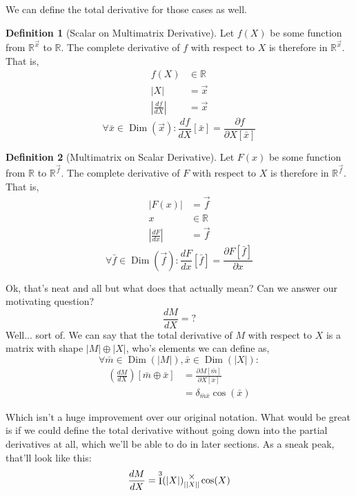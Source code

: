 \documentclass[12pt]{article}
\theoremstyle{definition}
\newtheorem{definition}{Definition}[section]
\theoremstyle{plain}
\theoremstyle{ppart}
\DeclareMathOperator{\Dim}{Dim}
\DeclareMathOperator{\Ident}{I}
\newcommand{\mmult}[1]{\text{\raisebox{1ex}{$\underset{#1}{\times}$}}}
\begin{document}
We can define the total derivative for those cases as well.

\begin{definition}[Scalar on Multimatrix Derivative]
\label{sm_derivative}
Let $f(X)$ be some function from $\mathbb{R}^{\vec{x}}$ to $\mathbb{R}$.
The complete derivative of $f$ with respect to $X$ is therefore in
$\mathbb{R}^{\vec{x}}$. That is,
\begin{align*}
f(X) &\in \mathbb{R} \\
|X| &= \vec{x} \\
\left|\frac{df}{dX}\right| &= \vec{x}
\end{align*}
\[
\forall \bar{x} \in \Dim(\vec{x}):
        \frac{df}{dX}[\bar{x}] =
        \frac{\partial f}{\partial X[\bar{x}]}
\]
\end{definition}

\begin{definition}[Multimatrix on Scalar Derivative]
\label{ms_derivative}
Let $F(x)$ be some function from $\mathbb{R}$ to $\mathbb{R}^{\vec{f}}$.
The complete derivative of $F$ with respect to $X$ is therefore in
$\mathbb{R}^{\vec{f}}$. That is,
\begin{align*}
|F(x)| &= \vec{f} \\
x &\in \mathbb{R} \\
\left|\frac{dF}{dx}\right| &= \vec{f}
\end{align*}
\[
\forall \bar{f} \in \Dim(\vec{f}):
        \frac{dF}{dx}[\bar{f}] =
        \frac{\partial F[\bar{f}]}{\partial x}
\]
\end{definition}

Ok, that's neat and all but what does that actually mean? Can we answer our motivating 
question?
\[\frac{dM}{dX} = ? \]
Well... sort of. We can say that the total derivative of $M$ with respect to $X$ is
a matrix with shape $|M| \oplus |X|$, who's elements we can define as,
\[\forall \bar{m} \in \Dim(|M|), \bar{x} \in \Dim(|X|):\]
\begin{align*}
\left( \frac{dM}{dX} \right)[\bar{m} \oplus \bar{x}]
&= \frac{\partial M[\bar{m}]}{\partial X[\bar{x}]} \\
&= \delta_{\bar{m}\bar{x}}\cos(\bar{x})
\end{align*}

Which isn't a huge improvement over our original notation. What would be great is
if we could define the total derivative without going down into the partial derivatives
at all, which we'll be able to do in later sections. As a sneak peak, that'll look
like this:
\[
\frac{dM}{dX} = \Ident^3(|X|) \mmult{||X||} \cos(X)
\]
\end{document}
